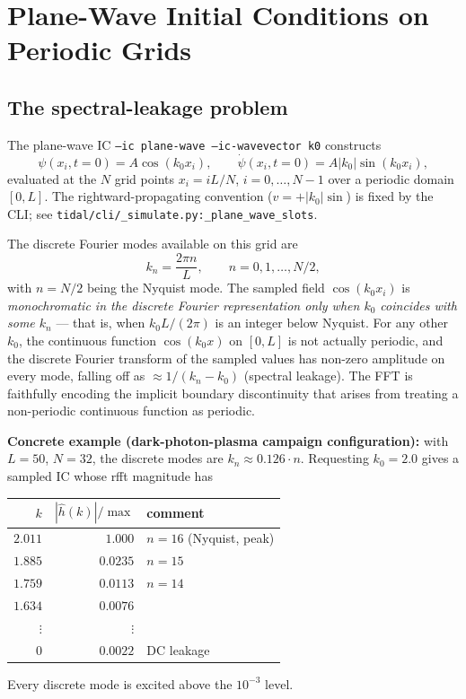 
\section{Plane-Wave Initial Conditions on Periodic Grids}
\label{sec:plane-wave-ic}

\subsection{The spectral-leakage problem}
\label{sec:pw-leakage}

The plane-wave IC \texttt{--ic plane-wave --ic-wavevector k0} constructs
\begin{equation}
  \psi(x_i, t=0) = A \cos(k_0 x_i), \qquad
  \dot{\psi}(x_i, t=0) = A |k_0| \sin(k_0 x_i),
  \label{eq:pw-ic-cont}
\end{equation}
evaluated at the $N$ grid points $x_i = i L / N$, $i = 0, \ldots, N-1$ over a
periodic domain $[0, L]$. The rightward-propagating convention
($v = +|k_0| \sin$) is fixed by the CLI; see
\texttt{tidal/cli/\_simulate.py:\_plane\_wave\_slots}.

The discrete Fourier modes available on this grid are
\begin{equation}
  k_n = \frac{2\pi n}{L}, \qquad n = 0, 1, \ldots, N/2,
  \label{eq:discrete-modes}
\end{equation}
with $n = N/2$ being the Nyquist mode. The sampled field
$\cos(k_0 x_i)$ is \emph{monochromatic in the discrete Fourier
representation only when $k_0$ coincides with some $k_n$} --- that is, when
$k_0 L / (2\pi)$ is an integer below Nyquist. For any other $k_0$, the
continuous function $\cos(k_0 x)$ on $[0, L]$ is not actually periodic,
and the discrete Fourier transform of the sampled values has non-zero
amplitude on every mode, falling off as
$\approx 1 / (k_n - k_0)$ (spectral leakage). The FFT is faithfully
encoding the implicit boundary discontinuity that arises from treating
a non-periodic continuous function as periodic.

\textbf{Concrete example (dark-photon-plasma campaign configuration):} with
$L = 50$, $N = 32$, the discrete modes are $k_n \approx 0.126 \cdot n$.
Requesting $k_0 = 2.0$ gives a sampled IC whose rfft magnitude has
\begin{center}
\begin{tabular}{rrl}
$k$ & $|\hat{h}(k)| / \max$ & comment \\ \hline
$2.011$ & $1.000$ & $n = 16$ (Nyquist, peak) \\
$1.885$ & $0.0235$ & $n = 15$ \\
$1.759$ & $0.0113$ & $n = 14$ \\
$1.634$ & $0.0076$ & \\
$\vdots$ & $\vdots$ & \\
$0$     & $0.0022$ & DC leakage \\
\end{tabular}
\end{center}
Every discrete mode is excited above the $10^{-3}$ level.

